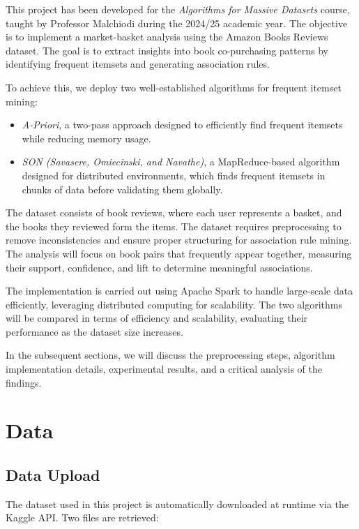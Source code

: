 \documentclass[a4paper,12pt]{article}
\begin{document}
This project has been developed for the \textit{Algorithms for Massive Datasets} course, taught by Professor Malchiodi during the 2024/25 academic year. The objective is to implement a market-basket analysis using the Amazon Books Reviews dataset. The goal is to extract insights into book co-purchasing patterns by identifying frequent itemsets and generating association rules.

To achieve this, we deploy two well-established algorithms for frequent itemset mining:  
\begin{itemize}
    \item \textit{A-Priori}, a two-pass approach designed to efficiently find frequent itemsets while reducing memory usage.
    \item \textit{SON (Savasere, Omiecinski, and Navathe)}, a MapReduce-based algorithm designed for distributed environments, which finds frequent itemsets in chunks of data before validating them globally.
\end{itemize}

The dataset consists of book reviews, where each user represents a basket, and the books they reviewed form the items. The dataset requires preprocessing to remove inconsistencies and ensure proper structuring for association rule mining. The analysis will focus on book pairs that frequently appear together, measuring their support, confidence, and lift to determine meaningful associations.

The implementation is carried out using Apache Spark to handle large-scale data efficiently, leveraging distributed computing for scalability. The two algorithms will be compared in terms of efficiency and scalability, evaluating their performance as the dataset size increases.

In the subsequent sections, we will discuss the preprocessing steps, algorithm implementation details, experimental results, and a critical analysis of the findings.


\newpage
\section{Data}

\subsection{Data Upload}

The dataset used in this project is automatically downloaded at runtime via the Kaggle API. Two files are retrieved:
\end{document}
